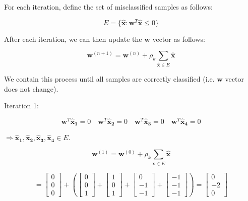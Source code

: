 \documentclass[fleqn]{article}
\begin{document}
\begin{enumerate}
		For each iteration, define the set of misclassified samples as follows:
		
		\begin{equation*}
			E = \{\mathbf{\hat{x}}: \mathbf{w}^T\mathbf{\hat{x}} \leq 0\}
		\end{equation*}
		
		After each iteration, we can then update the $\mathbf{w}$ vector as follows:
		
		\begin{equation*}
			\mathbf{w}^{(n+1)} = \mathbf{w}^{(n)} + \rho_k\sum_{\mathbf{\hat{x}} \in E}{\mathbf{\hat{x}}}
		\end{equation*}
		
		We contain this process until all samples are correctly classified (i.e. $\mathbf{w}$ vector does not change).
		
		Iteration 1:
		
		\begin{equation*}
			\mathbf{w}^T\mathbf{\hat{x}_1} = 0 \quad \mathbf{w}^T\mathbf{\hat{x}_2} = 0 \quad \mathbf{w}^T\mathbf{\hat{x}_3} = 0 \quad \mathbf{w}^T\mathbf{\hat{x}_4} = 0
		\end{equation*}
		
		$\Rightarrow \mathbf{\hat{x}_1}, \mathbf{\hat{x}_2}, \mathbf{\hat{x}_3}, \mathbf{\hat{x}_4} \in E$.
		
		\begin{equation*}
			\mathbf{w}^{(1)} = \mathbf{w}^{(0)} + \rho_k\sum_{\mathbf{\hat{x}} \in E}{\mathbf{\hat{x}}}
		\end{equation*}
			
		\begin{equation*}
			= \begin{bmatrix} 0 \\ 0 \\ 0 \end{bmatrix}			 + \left(\begin{bmatrix}0\\0\\1\end{bmatrix} + \begin{bmatrix}1\\0\\1\end{bmatrix} + \begin{bmatrix}0\\-1\\-1\end{bmatrix} + \begin{bmatrix}-1\\-1\\-1\end{bmatrix}\right) = \begin{bmatrix}0\\-2\\0\end{bmatrix}
		\end{equation*}
		

\end{enumerate}
\end{document}
